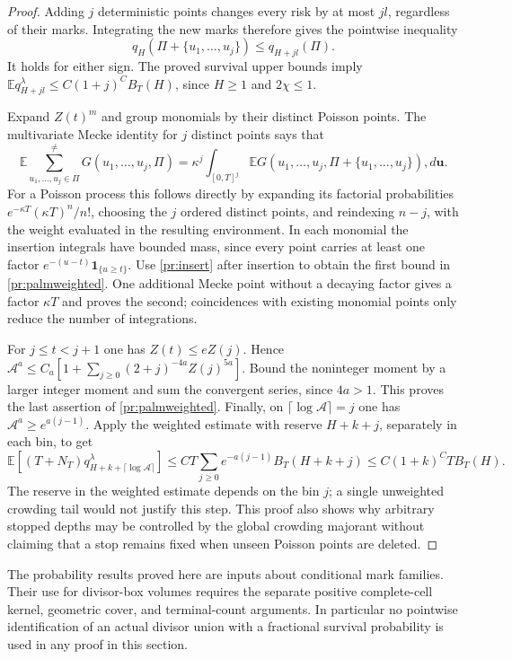 \begin{proof}
Adding $j$ deterministic points changes every risk by at most $jl$,
regardless of their marks. Integrating the new marks therefore gives
the pointwise inequality
\begin{equation}
 q_H(\Pi+\{u_1,\ldots,u_j\})\le q_{H+jl}(\Pi).             \label{pr:insert}
\end{equation}
It holds for either sign. The proved survival upper bounds imply
$\mathbb E q_{H+jl}^\lambda\le C(1+j)^C B_T(H)$, since $H\ge1$ and
$2\chi\le1$.

Expand $Z(t)^m$ and group monomials by their distinct Poisson points.
The multivariate Mecke identity for $j$ distinct points says that
\[
 \mathbb E\sum_{u_1,\ldots,u_j\in\Pi}^{\ne}
 G(u_1,\ldots,u_j,\Pi)
 =\kappa^j\int_{[0,T]^j}
   \mathbb E G(u_1,\ldots,u_j,\Pi+\{u_1,\ldots,u_j\}),d\boldsymbol u.
\]
For a Poisson process this follows directly by expanding its factorial
probabilities $e^{-\kappa T}(\kappa T)^n/n!$, choosing the $j$ ordered
distinct points, and reindexing $n-j$, with the weight evaluated in
the resulting environment. In each monomial the insertion
integrals have bounded mass, since every point carries at least one
factor $e^{-(u-t)}\boldsymbol1_{\{u\ge t\}}$. Use
\eqref{pr:insert} after insertion to obtain the first bound in
\eqref{pr:palmweighted}. One additional Mecke point without a decaying
factor gives a factor $\kappa T$ and proves the second; coincidences
with existing monomial points only reduce the number of integrations.

For $j\le t<j+1$ one has $Z(t)\le eZ(j)$. Hence
$\mathcal A^a\le C_a[1+\sum_{j\ge0}(2+j)^{-4a}Z(j)^{5a}]$.
Bound the noninteger moment by a larger integer moment and sum the
convergent series, since $4a>1$. This proves the last assertion of
\eqref{pr:palmweighted}.
Finally, on $\lceil\log\mathcal A\rceil=j$ one has
$\mathcal A^a\ge e^{a(j-1)}$. Apply the weighted estimate with reserve
$H+k+j$, separately in each bin, to get
\[
 \mathbb E[(T+N_T)q_{H+k+\lceil\log\mathcal A\rceil}^{\lambda}]
 \le CT\sum_{j\ge0}e^{-a(j-1)} B_T(H+k+j)
 \le C(1+k)^C T B_T(H).
\]
The reserve in the weighted estimate depends on the bin $j$; a single
unweighted crowding tail would not justify this step. This proof also
shows why arbitrary stopped depths may be controlled by the global
crowding majorant without claiming that a stop remains fixed when
unseen Poisson points are deleted.
\end{proof}

The probability results proved here are inputs about conditional mark
families. Their use for divisor-box volumes requires the separate positive
complete-cell kernel, geometric cover, and terminal-count arguments.
In particular no pointwise identification of an actual divisor union
with a fractional survival probability is used in any proof in this section.
